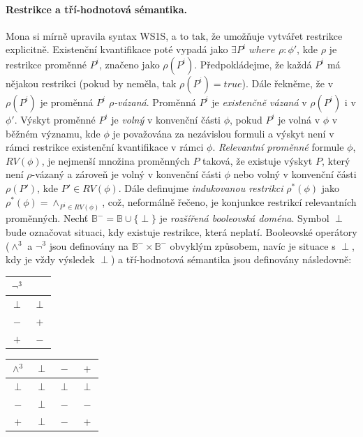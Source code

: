\paragraph{Restrikce a tří-hodnotová sémantika.} Mona si mírně upravila syntax WS1S, a to tak, že umožňuje vytvářet restrikce explicitně. Existenční kvantifikace poté vypadá jako $\exists P^i$ $ where $ $\rho: \phi'$, kde $\rho$ je restrikce proměnné $P^i$, značeno jako $\rho (P^i)$. Předpokládejme, že každá $P^i$ má nějakou restrikci (pokud by neměla, tak $\rho (P^i)=true$). Dále řekněme, že v~$\rho (P^i)$ je proměnná $P^i$ \textit{$\rho$-vázaná}. Proměnná $P^i$ je \textit{existenčně vázaná} v $\rho (P^i)$ i v $\phi'$. Výskyt proměnné $P^i$ je \textit{volný} v konvenční části $\phi$, pokud $P^i$ je volná v $\phi$ v běžném významu, kde $\phi$ je považována za nezávislou formuli a výskyt není v rámci restrikce existenční kvantifikace v rámci $\phi$. \textit{Relevantní proměnné} formule $\phi$, $RV(\phi)$, je nejmenší množina proměnných $P$ taková, že existuje výskyt $P$, který není $\rho$-vázaný a zároveň je volný v konvenční části $\phi$ nebo volný v konvenční části $\rho(P')$, kde $P' \in RV(\phi)$. Dále definujme \textit{indukovanou restrikci} $\rho^*(\phi)$ jako $\rho^*(\phi)= \wedge_{P^i\in RV(\phi)} $, což, neformálně řečeno, je konjunkce restrikcí relevantních proměnných. Nechť $\mathbb{B}^- = \mathbb{B} \cup \{ \perp \} $ je \textit{rozšířená booleovská doména}. Symbol $\perp$ bude označovat situaci, kdy existuje restrikce, která neplatí. Booleovské operátory ($\wedge^3$ a $\neg^3$ jsou definovány na $ \mathbb{B}^- \times \mathbb{B}^- $ obvyklým způsobem, navíc je situace s $\perp$, kdy je vždy výsledek $\perp$) a tří-hodnotová sémantika jsou definovány následovně:


\begin{center}
    \begin{tabular}{c|c}
        $\neg^3$ &  \\ \hline
        $\perp$ & $\perp$ \\ 
        $-$ & $+$ \\ 
        $+$ & $-$ \\ 
    \end{tabular}
    \quad
    \begin{tabular}{c|ccc}
        $\wedge^3$ & $\perp$ & $-$ & $+$ \\ \hline
        $\perp$ & $\perp$ & $\perp$ & $\perp$ \\ 
        $-$ & $\perp$ & $-$ & $-$ \\ 
        $+$ & $\perp$ & $-$ & $+$ \\ 
    \end{tabular}
\end{center}

